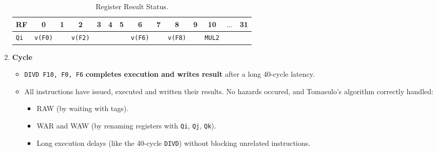 \begin{enumerate}
    \begin{table}[!htp]
        \centering
        \begin{adjustbox}{width={\textwidth},totalheight={\textheight},keepaspectratio}
            \begin{tabular}{@{} l | c c c c c c c c c c c c c @{}}
                \toprule
                RF              & 0                     & 1             & 2                     & 3             & 4             & 5             & 6                     & 7             & 8                     & 9             & 10                    & $\dots$           & 31            \\
                \midrule
                \texttt{Qi}     & \texttt{v(F0)}        &               & \texttt{v(F2)}        &               &               &               & \texttt{v(F6)}        &               & \texttt{v(F8)}        &               & \texttt{MUL2}         &                   &               \\
                \bottomrule
            \end{tabular}   
        \end{adjustbox}
        \caption*{Register Result Status.}
    \end{table}

    \newpage
    \setcounter{enumi}{58}


    \item \textbf{Cycle \theenumi}
    \begin{itemize}
        \item \texttt{DIVD F10, F0, F6} \textbf{completes execution and writes result} after a long 40-cycle latency.
        \item All instructions have issued, executed and written their results. No hazards occured, and Tomasulo's algorithm correctly handled:
        \begin{itemize}[label=\textcolor{Green3}{}]
            \item RAW (by waiting with tags).
            \item WAR and WAW (by renaming registers with \texttt{Qi}, \texttt{Qj}, \texttt{Qk}).
            \item Long execution delays (like the 40-cycle \texttt{DIVD}) without blocking unrelated instructions.
        \end{itemize}
    \end{itemize}


\end{enumerate}
